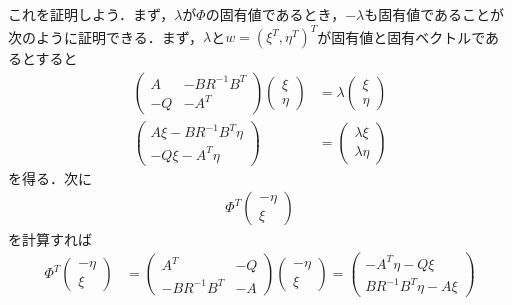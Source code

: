 これを証明しよう．まず，$\lambda$が$\Phi$の固有値であるとき，$-\lambda$も固有値であることが次のように証明できる．まず，$\lambda$と$w = (\xi^T, \eta^T)^T$が固有値と固有ベクトルであるとすると
\begin{align}
	\left(\begin{array}{cc}
	       A  & - B R^{-1} B^T \\
	       -Q & - A^T
	\end{array}\right)
		  \left(\begin{array}{c}
	        \xi \\
	        \eta
	      \end{array}\right)
	&= \lambda
		  \left(\begin{array}{c}
	        \xi \\
	        \eta
	      \end{array}\right)
\nonumber \\
	\left(\begin{array}{c}
	       A \xi - B R^{-1} B^T \eta \\
	       -Q\xi - A^T \eta
	\end{array}\right)
	&=
		  \left(\begin{array}{c}
	        \lambda \xi \\
	        \lambda \eta
	      \end{array}\right)
\label{potter_1}
\end{align}
を得る．次に
\begin{align}
	\Phi^T 
		  \left(\begin{array}{c}
	        - \eta \\
	          \xi
	      \end{array}\right)
\nonumber	
\end{align}
を計算すれば
\begin{align}
	\Phi^T 
		  \left(\begin{array}{c}
	        - \eta \\
	          \xi
	      \end{array}\right)
	&=
	\left(\begin{array}{cc}
	       A^T            &  -Q \\
	       - B R^{-1} B^T & - A
	\end{array}\right)
		  \left(\begin{array}{c}
	        - \eta \\
	          \xi
	      \end{array}\right)
	=
	\left(\begin{array}{c}
	       - A^T \eta  -Q \xi \\
	       B R^{-1} B^T \eta - A \xi
	\end{array}\right)
\end{align}
